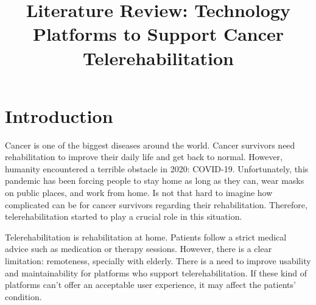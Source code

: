 \documentclass[conference]{IEEEtran}
\begin{document}
\title{Literature Review: Technology Platforms to Support Cancer Telerehabilitation}

\author{
}

\maketitle



\section{Introduction}
Cancer is one of the biggest diseases around the world. Cancer survivors need rehabilitation to improve their daily life and get back to normal. However, humanity encountered a terrible obstacle in 2020: COVID-19. Unfortunately, this pandemic has been forcing people to stay home as long as they can, wear masks on public places, and work from home. Is not that hard to imagine how complicated can be for cancer survivors regarding their rehabilitation. Therefore, telerehabilitation started to play a crucial role in this situation.

Telerehabilitation is rehabilitation at home. Patients follow a strict medical advice such as medication or therapy sessions. However, there is a clear limitation: remoteness, specially with elderly. There is a need to improve usability and maintainability for platforms who support telerehabilitation. If these kind of platforms can't offer an acceptable user experience, it may affect the patients' condition. 
\end{document}
